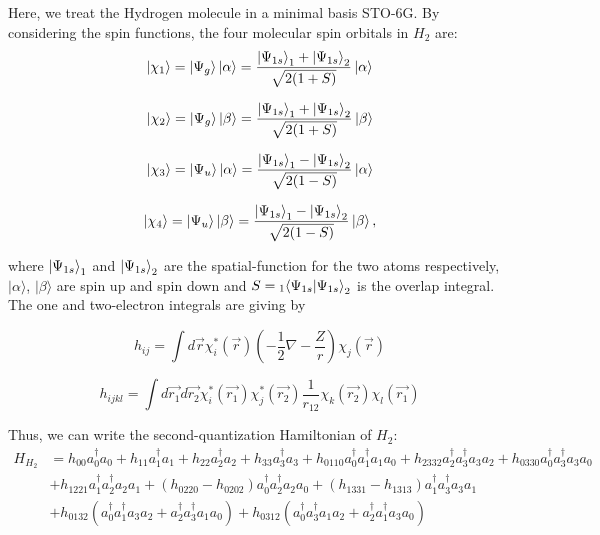 \documentclass{article}
\begin{document}
Here, we treat the Hydrogen molecule in a minimal basis STO-6G. By considering the spin functions, the four molecular spin orbitals in $H_2$ are:
\begin{equation}
\ket{\chi_1} = \ket{\Psi_g}\ket{\alpha} = \frac{ \ket{\Psi_{1s}}_1+\ket{\Psi_{1s}}_2}{\sqrt{2(1+S)}}\ket{\alpha}
\end{equation}


\begin{equation}
\ket{\chi_2} = \ket{\Psi_g}\ket{\beta} = \frac{ \ket{\Psi_{1s}}_1+\ket{\Psi_{1s}}_2}{\sqrt{2(1+S)}}\ket{\beta}
\end{equation}

\begin{equation}
\ket{\chi_3} = \ket{\Psi_u}\ket{\alpha} = \frac{ \ket{\Psi_{1s}}_1-\ket{\Psi_{1s}}_2}{\sqrt{2(1-S)}}\ket{\alpha}
\end{equation}

\begin{equation}
\ket{\chi_4} = \ket{\Psi_u}\ket{\beta} = \frac{ \ket{\Psi_{1s}}_1-\ket{\Psi_{1s}}_2}{\sqrt{2(1-S)}}\ket{\beta} ,
\end{equation}

where $\ket{\Psi_{1s}}_1$ and $\ket{\Psi_{1s}}_2$ are the spatial-function for the two atoms respectively, $|\alpha\rangle$, $|\beta\rangle$ are spin up and spin down and $S ={}_{\raisebox{1.535pt}{\scalebox{0.74}{1}}}{\braket{\Psi_{1s}|\Psi_{1s}}}_2$ is the overlap integral\cite{pyquant}. The one and two-electron integrals are giving by

\begin{equation}
h_{ij} = \int{d\vec{r}\chi_i^*(\vec{r})(-\frac{1}{2}\nabla-\frac{Z}{r})\chi_j(\vec{r})}
\end{equation}

\begin{equation}
h_{ijkl} = \int{d\vec{r_1}d\vec{r_2}\chi_{i}^*(\vec{r_1})\chi_{j}^*(\vec{r_2})\frac{1}{r_{12}}\chi_{k}(\vec{r_2})\chi_{l}(\vec{r_1})}
\end{equation}


Thus, we can write the second-quantization Hamiltonian of $H_2$:
\begin{equation}
\begin{aligned}
H_{H_2} &= h_{00}a_0^\dagger a_0 + h_{11}a_1^\dagger a_1+ h_{22}a_2^\dagger a_2 + h_{33}a_3^\dagger a_3+
h_{0110}a_0^\dagger a_1^\dagger a_1 a_0 +h_{2332}a_2^\dagger a_3^\dagger a_3 a_2 + h_{0330}a_0^\dagger a_3^\dagger a_3 a_0\\
&+ h_{1221} a_1^\dagger a_2^\dagger a_2 a_1 + (h_{0220} - h_{0202})a_0^\dagger a_2^\dagger a_2 a_0
+ (h_{1331}-h_{1313})a_1^\dagger a_3^\dagger a_3 a_1 \\
&+h_{0132}(a_0^\dagger a_1^\dagger a_3 a_2 + a_2^\dagger a_3^\dagger a_1 a_0)+
h_{0312}(a_0^\dagger a_3^\dagger a_1 a_2 + a_2^\dagger a_1^\dagger a_3 a_0)
\end{aligned}
\end{equation}
\end{document}
